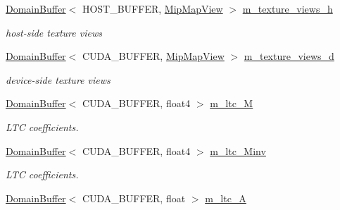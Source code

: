 \begin{DoxyCompactItemize}
\hyperlink{class_domain_buffer}{Domain\+Buffer}$<$ H\+O\+S\+T\+\_\+\+B\+U\+F\+F\+ER, \hyperlink{struct_mip_map_view}{Mip\+Map\+View} $>$ \hyperlink{struct_rendering_context_impl_a390a67d54ac7af5ab7e9d014dafb1c3e}{m\+\_\+texture\+\_\+views\+\_\+h}
\begin{DoxyCompactList}\small\item\em host-\/side texture views \end{DoxyCompactList}\item 
\mbox{\label{struct_rendering_context_impl_a06fe79c0728808089dff0e3971ecdbad}} 
\hyperlink{class_domain_buffer}{Domain\+Buffer}$<$ C\+U\+D\+A\+\_\+\+B\+U\+F\+F\+ER, \hyperlink{struct_mip_map_view}{Mip\+Map\+View} $>$ \hyperlink{struct_rendering_context_impl_a06fe79c0728808089dff0e3971ecdbad}{m\+\_\+texture\+\_\+views\+\_\+d}
\begin{DoxyCompactList}\small\item\em device-\/side texture views \end{DoxyCompactList}\item 
\mbox{\label{struct_rendering_context_impl_a565b381e96eb7010c40c57204b021c9f}} 
\hyperlink{class_domain_buffer}{Domain\+Buffer}$<$ C\+U\+D\+A\+\_\+\+B\+U\+F\+F\+ER, float4 $>$ \hyperlink{struct_rendering_context_impl_a565b381e96eb7010c40c57204b021c9f}{m\+\_\+ltc\+\_\+M}
\begin{DoxyCompactList}\small\item\em L\+TC coefficients. \end{DoxyCompactList}\item 
\mbox{\label{struct_rendering_context_impl_a1f8f820100b16266f80f11746686628a}} 
\hyperlink{class_domain_buffer}{Domain\+Buffer}$<$ C\+U\+D\+A\+\_\+\+B\+U\+F\+F\+ER, float4 $>$ \hyperlink{struct_rendering_context_impl_a1f8f820100b16266f80f11746686628a}{m\+\_\+ltc\+\_\+\+Minv}
\begin{DoxyCompactList}\small\item\em L\+TC coefficients. \end{DoxyCompactList}\item 
\mbox{\label{struct_rendering_context_impl_a8c21753b20c5ce0d906804e602ba11b5}} 
\hyperlink{class_domain_buffer}{Domain\+Buffer}$<$ C\+U\+D\+A\+\_\+\+B\+U\+F\+F\+ER, float $>$ \hyperlink{struct_rendering_context_impl_a8c21753b20c5ce0d906804e602ba11b5}{m\+\_\+ltc\+\_\+A}

\end{DoxyCompactItemize}
